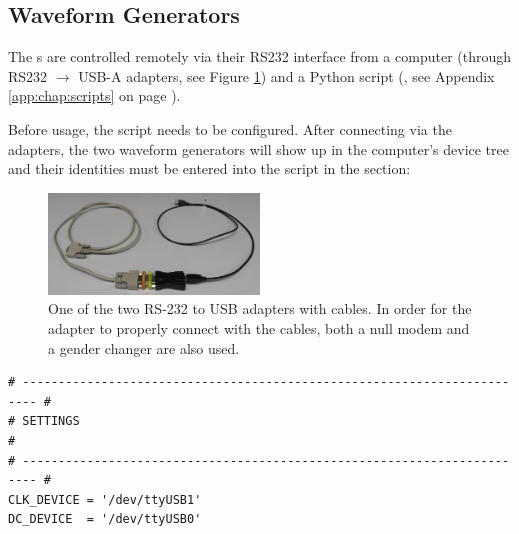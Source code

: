 
\subsection{Waveform Generators}
\label{subsec:33120A}

The  \funcgen  s  are  controlled  remotely via  their  RS232  interface  from
a   computer  (through   RS232  $\rightarrow$   USB-A  adapters,   see  Figure
\ref{fig:rs232-usb})  and  a  Python script  (,  see  Appendix
\ref{app:chap:scripts} on page \pageref{app:chap:scripts}).

Before  usage, the  script needs  to be  configured. After connecting  via the
adapters,  the  two  waveform  generators  will  show  up  in  the  computer's
device  tree and  their identities  must  be entered  into the  script in  the
 section:

\begin{figure}
    \centering
    \includegraphics[width=0.5\textwidth]{images/expSetup/rs232-usb.jpeg}
    \caption{%
        One of  the two RS-232 to  USB adapters with cables. In  order for the
        adapter to properly  connect with the cables, both a  null modem and a
        gender changer are also used.
    }
    \label{fig:rs232-usb}
\end{figure}

\begin{verbatim}
# ------------------------------------------------------------------------ #
# SETTINGS                                                                 #
# ------------------------------------------------------------------------ #
CLK_DEVICE = '/dev/ttyUSB1'
DC_DEVICE  = '/dev/ttyUSB0'
\end{verbatim}

